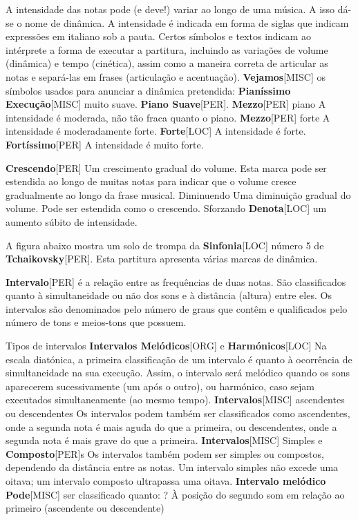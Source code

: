 \documentclass[a4paper,12pt]{article}
\begin{document}
A intensidade das notas pode (e deve!) variar ao longo de uma música. A isso dá-se o nome de dinâmica. A intensidade é indicada em forma de siglas que indicam expressões em italiano sob a pauta. Certos símbolos e textos indicam ao intérprete a forma de executar a partitura, incluindo as variações de volume (dinâmica) e tempo (cinética), assim como a maneira correta de articular as notas e separá-las em frases (articulação e acentuação). \textbf{Vejamos}\textsc{[MISC]} os símbolos usados para anunciar a dinâmica pretendida: \textbf{Pianíssimo Execução}\textsc{[MISC]} muito suave. \textbf{Piano Suave}\textsc{[PER]}. \textbf{Mezzo}\textsc{[PER]} piano A intensidade é moderada, não tão fraca quanto o piano. \textbf{Mezzo}\textsc{[PER]} forte A intensidade é moderadamente forte. \textbf{Forte}\textsc{[LOC]} A intensidade é forte. \textbf{Fortíssimo}\textsc{[PER]} A intensidade é muito forte.

\textbf{Crescendo}\textsc{[PER]} Um crescimento gradual do volume. Esta marca pode ser estendida ao longo de muitas notas para indicar que o volume cresce gradualmente ao longo da frase musical. Diminuendo Uma diminuição gradual do volume. Pode ser estendida como o crescendo. Sforzando \textbf{Denota}\textsc{[LOC]} um aumento súbito de intensidade.

A figura abaixo mostra um solo de trompa da \textbf{Sinfonia}\textsc{[LOC]} número 5 de \textbf{Tchaikovsky}\textsc{[PER]}. Esta partitura apresenta várias marcas de dinâmica.

\textbf{Intervalo}\textsc{[PER]} é a relação entre as frequências de duas notas. São classificados quanto à simultaneidade ou não dos sons e à distância (altura) entre eles. Os intervalos são denominados pelo número de graus que contêm e qualificados pelo número de tons e meios-tons que possuem.

Tipos de intervalos \textbf{Intervalos Melódicos}\textsc{[ORG]} e \textbf{Harmónicos}\textsc{[LOC]} Na escala diatónica, a primeira classificação de um intervalo é quanto à ocorrência de simultaneidade na sua execução. Assim, o intervalo será melódico quando os sons aparecerem sucessivamente (um após o outro), ou harmónico, caso sejam executados simultaneamente (ao mesmo tempo). \textbf{Intervalos}\textsc{[MISC]} ascendentes ou descendentes Os intervalos podem também ser classificados como ascendentes, onde a segunda nota é mais aguda do que a primeira, ou descendentes, onde a segunda nota é mais grave do que a primeira. \textbf{Intervalos}\textsc{[MISC]} Simples e \textbf{Composto}\textsc{[PER]}s Os intervalos também podem ser simples ou compostos, dependendo da distância entre as notas. Um intervalo simples não excede uma oitava; um intervalo composto ultrapassa uma oitava. \textbf{Intervalo melódico Pode}\textsc{[MISC]} ser classificado quanto: ? À posição do segundo som em relação ao primeiro (ascendente ou descendente)
\end{document}
